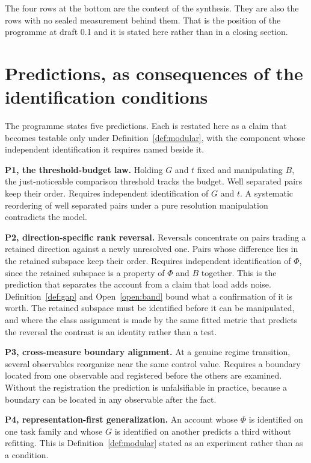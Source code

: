 \documentclass[11pt,letterpaper]{article}
\theoremstyle{plain}
\theoremstyle{definition}
\begin{document}
The four rows at the bottom are the content of the synthesis. They are also the
rows with no sealed measurement behind them. That is the position of the
programme at draft 0.1 and it is stated here rather than in a closing section.

\section{Predictions, as consequences of the identification conditions}

The programme states five predictions. Each is restated here as a claim that
becomes testable only under Definition~\ref{def:modular}, with the component
whose independent identification it requires named beside it.

\textbf{P1, the threshold-budget law.} Holding $G$ and $t$ fixed and
manipulating $B$, the just-noticeable comparison threshold tracks the budget.
Well separated pairs keep their order. Requires independent identification of
$G$ and $t$. A systematic reordering of well separated pairs under a pure
resolution manipulation contradicts the model.

\textbf{P2, direction-specific rank reversal.} Reversals concentrate on pairs
trading a retained direction against a newly unresolved one. Pairs whose
difference lies in the retained subspace keep their order. Requires independent
identification of $\Phi$, since the retained subspace is a property of $\Phi$
and $B$ together. This is the prediction that separates the account from a claim
that load adds noise. Definition~\ref{def:gap} and Open~\ref{open:band} bound what a
confirmation of it is worth. The retained subspace must be identified before it
can be manipulated, and where the class assignment is made by the same fitted
metric that predicts the reversal the contrast is an identity rather than a
test.

\textbf{P3, cross-measure boundary alignment.} At a genuine regime transition,
several observables reorganize near the same control value. Requires a boundary
located from one observable and registered before the others are examined.
Without the registration the prediction is unfalsifiable in practice, because a
boundary can be located in any observable after the fact.

\textbf{P4, representation-first generalization.} An account whose $\Phi$ is
identified on one task family and whose $G$ is identified on another predicts a
third without refitting. This is Definition~\ref{def:modular} stated as an
experiment rather than as a condition.
\end{document}
